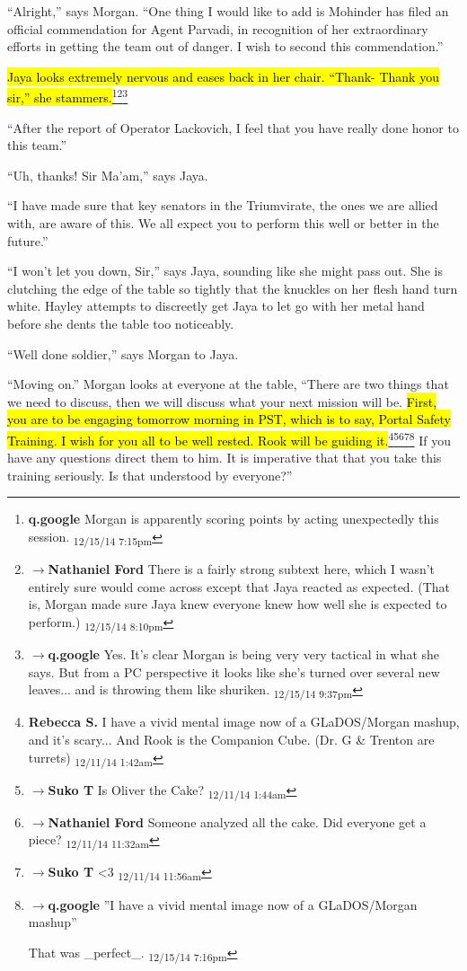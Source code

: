 ``Alright,'' says Morgan.  ``One thing I would like to add is Mohinder has filed an official commendation for Agent Parvadi, in recognition of her extraordinary efforts in getting the team out of danger. I wish to second this commendation.''

\hl{Jaya looks extremely nervous and eases back in her chair. ``Thank- Thank you sir,'' she stammers.}\footnote{\textbf{q.google }Morgan is apparently scoring points by acting unexpectedly this session. \textsubscript{12/15/14 7:15pm}}\footnote{$\rightarrow$\textbf{Nathaniel Ford }There is a fairly strong subtext here, which I wasn't entirely sure would come across except that Jaya reacted as expected. (That is, Morgan made sure Jaya knew everyone knew how well she is expected to perform.) \textsubscript{12/15/14 8:10pm}}\footnote{$\rightarrow$\textbf{q.google }Yes.  It's clear Morgan is being very very tactical in what she says.  But from a PC perspective it looks like she's turned over several new leaves... and is throwing them like shuriken. \textsubscript{12/15/14 9:37pm}}

``After the report of Operator Lackovich, I feel that you have really done honor to this team.''

``Uh, thanks!  Sir Ma'am,'' says Jaya.

``I have made sure that key senators in the Triumvirate, the ones we are allied with, are aware of this.  We all expect you to perform this well or better in the future.''

``I won't let you down, Sir,'' says Jaya, sounding like she might pass out.  She is clutching the edge of the table so tightly that the knuckles on her flesh hand turn white.  Hayley attempts to discreetly get Jaya to let go with her metal hand before she dents the table too noticeably. 

``Well done soldier,'' says Morgan to Jaya.  



``Moving on.''  Morgan looks at everyone at the table, ``There are two things that we need to discuss, then we will discuss what your next mission will be. \hl{First, you are to be engaging tomorrow morning in PST, which is to say, Portal Safety Training.  I wish for you all to be well rested.  Rook will be guiding it.}\footnote{\textbf{Rebecca S. }I have a vivid mental image now of a GLaDOS/Morgan mashup, and it's scary... And Rook is the Companion Cube. (Dr. G \& Trenton are turrets) \textsubscript{12/11/14 1:42am}}\footnote{$\rightarrow$\textbf{Suko T }Is Oliver the Cake? \textsubscript{12/11/14 1:44am}}\footnote{$\rightarrow$\textbf{Nathaniel Ford }Someone analyzed all the cake. Did everyone get a piece? \textsubscript{12/11/14 11:32am}}\footnote{$\rightarrow$\textbf{Suko T }\textless 3 \textsubscript{12/11/14 11:56am}}\footnote{$\rightarrow$\textbf{q.google }''I have a vivid mental image now of a GLaDOS/Morgan mashup''

That was \_perfect\_. \textsubscript{12/15/14 7:16pm}} If you have any questions direct them to him.  It is imperative that that you take this training seriously.  Is that understood by everyone?''  

